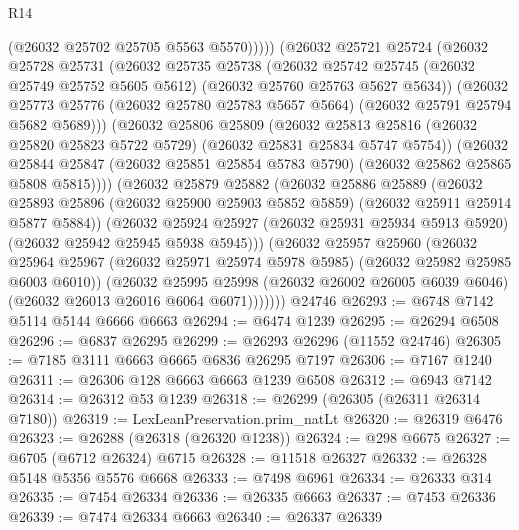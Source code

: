 \begin{lexlean}{R14}
\begin{coremodule}
                (@26032 @25702 @25705 @5563 @5570)))))
        (@26032
          @25721
          @25724
          (@26032
            @25728
            @25731
            (@26032
              @25735
              @25738
              (@26032
                @25742
                @25745
                (@26032 @25749 @25752 @5605 @5612)
                (@26032 @25760 @25763 @5627 @5634))
              (@26032
                @25773
                @25776
                (@26032 @25780 @25783 @5657 @5664)
                (@26032 @25791 @25794 @5682 @5689)))
            (@26032
              @25806
              @25809
              (@26032
                @25813
                @25816
                (@26032 @25820 @25823 @5722 @5729)
                (@26032 @25831 @25834 @5747 @5754))
              (@26032
                @25844
                @25847
                (@26032 @25851 @25854 @5783 @5790)
                (@26032 @25862 @25865 @5808 @5815))))
          (@26032
            @25879
            @25882
            (@26032
              @25886
              @25889
              (@26032
                @25893
                @25896
                (@26032 @25900 @25903 @5852 @5859)
                (@26032 @25911 @25914 @5877 @5884))
              (@26032
                @25924
                @25927
                (@26032 @25931 @25934 @5913 @5920)
                (@26032 @25942 @25945 @5938 @5945)))
            (@26032
              @25957
              @25960
              (@26032
                @25964
                @25967
                (@26032 @25971 @25974 @5978 @5985)
                (@26032 @25982 @25985 @6003 @6010))
              (@26032
                @25995
                @25998
                (@26032 @26002 @26005 @6039 @6046)
                (@26032 @26013 @26016 @6064 @6071)))))))
    @24746
@26293 := @6748 @7142 @5114 @5144 @6666 @6663
@26294 := @6474 @1239
@26295 := @26294 @6508
@26296 := @6837 @26295
@26299 := @26293 @26296 (@11552 @24746)
@26305 := @7185 @3111 @6663 @6665 @6836 @26295 @7197
@26306 := @7167 @1240
@26311 := @26306 @128 @6663 @6663 @1239 @6508
@26312 := @6943 @7142
@26314 := @26312 @53 @1239
@26318 := @26299 (@26305 (@26311 @26314 @7180))
@26319 := LexLeanPreservation.prim_natLt
@26320 := @26319 @6476
@26323 := @26288 (@26318 (@26320 @1238))
@26324 := @298 @6675
@26327 := @6705 (@6712 @26324) @6715
@26328 := @11518 @26327
@26332 := @26328 @5148 @5356 @5576 @6668
@26333 := @7498 @6961
@26334 := @26333 @314
@26335 := @7454 @26334
@26336 := @26335 @6663
@26337 := @7453 @26336
@26339 := @7474 @26334 @6663
@26340 := @26337 @26339

\end{coremodule}
\end{lexlean}
